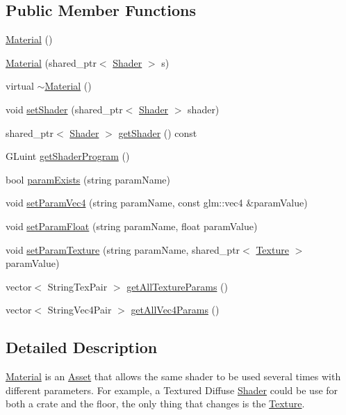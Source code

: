 \subsection*{Public Member Functions}
\begin{DoxyCompactItemize}
\item 
\hyperlink{class_material_a137e987401b63eb7c6c27c3e38bc74b5}{Material} ()
\item 
\hyperlink{class_material_a848e92f90d11160cc3e1242364fbc90f}{Material} (shared\+\_\+ptr$<$ \hyperlink{class_shader}{Shader} $>$ s)
\item 
virtual \hyperlink{class_material_a2c19452d71f54075df8f5405b03129f4}{$\sim$\+Material} ()
\item 
void \hyperlink{class_material_aa9ae26fd244e24eefd45d3bb052cd389}{set\+Shader} (shared\+\_\+ptr$<$ \hyperlink{class_shader}{Shader} $>$ shader)
\item 
shared\+\_\+ptr$<$ \hyperlink{class_shader}{Shader} $>$ \hyperlink{class_material_a4e7dd43b73e383064711a6fbeaa2cc93}{get\+Shader} () const 
\item 
G\+Luint \hyperlink{class_material_ab219530974ad3b8af237ed6e49412bce}{get\+Shader\+Program} ()
\item 
bool \hyperlink{class_material_ac6c1b9f3aa377b9db847bc6d4b22e3e9}{param\+Exists} (string param\+Name)
\item 
void \hyperlink{class_material_a4580ed8224b233f97e5bf2c3ee50eff8}{set\+Param\+Vec4} (string param\+Name, const glm\+::vec4 \&param\+Value)
\item 
void \hyperlink{class_material_a1a6c5fa9ce43ed14f42e5e8bab8b5d61}{set\+Param\+Float} (string param\+Name, float param\+Value)
\item 
void \hyperlink{class_material_a8b9da6d00b1f1bac06f12bb4be8c22d8}{set\+Param\+Texture} (string param\+Name, shared\+\_\+ptr$<$ \hyperlink{class_texture}{Texture} $>$ param\+Value)
\item 
vector$<$ String\+Tex\+Pair $>$ \hyperlink{class_material_aeec2f485d8d0194f87aca6666017f314}{get\+All\+Texture\+Params} ()
\item 
vector$<$ String\+Vec4\+Pair $>$ \hyperlink{class_material_a1d90151378394843fd0c19e08365c4f1}{get\+All\+Vec4\+Params} ()
\end{DoxyCompactItemize}


\subsection{Detailed Description}
\hyperlink{class_material}{Material} is an \hyperlink{class_asset}{Asset} that allows the same shader to be used several times with different parameters. For example, a Textured Diffuse \hyperlink{class_shader}{Shader} could be use for both a crate and the floor, the only thing that changes is the \hyperlink{class_texture}{Texture}.

